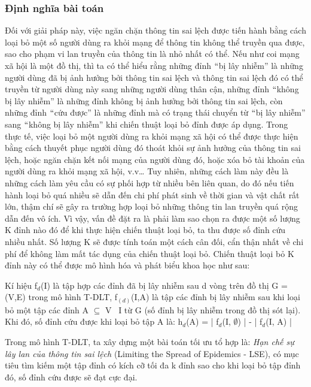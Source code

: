  		\subsubsection{Định nghĩa bài toán}
 		Đối với giải pháp này, việc ngăn chặn thông tin sai lệch được tiến hành bằng cách loại bỏ một số người dùng ra khỏi mạng để thông tin không thể truyền qua được, sao cho phạm vi lan truyền của thông tin là nhỏ nhất có thể. Nếu như coi mạng xã hội là một đồ thị, thì ta có thể hiểu rằng những đỉnh $``$bị lây nhiễm$”$ là những người dùng đã bị ảnh hưởng bởi thông tin sai lệch và thông tin sai lệch đó có thể truyền từ người dùng này sang những người dùng thân cận, những đỉnh $``$không bị lây nhiễm$”$ là những đỉnh không bị ảnh hưởng bởi thông tin sai lệch, còn những đỉnh $``$cứu được$”$ là những đỉnh mà có trạng thái chuyển từ $``$bị lây nhiễm$”$ sang $``$không bị lây nhiễm$”$ khi chiến thuật loại bỏ đỉnh được áp dụng. Trong thực tế, việc loại bỏ một người dùng ra khỏi mạng xã hội có thể được thực hiện bằng cách thuyết phục người dùng đó thoát khỏi sự ảnh hưởng của thông tin sai lệch, hoặc ngăn chặn kết nối mạng của người dùng đó, hoặc xóa bỏ tài khoản của người dùng ra khỏi mạng xã hội, v.v… Tuy nhiên, những cách làm này đều là những cách làm yêu cầu có sự phối hợp từ nhiều bên liên quan, do đó nếu tiến hành loại bỏ quá nhiều sẽ dẫn đến chi phí phát sinh về thời gian và vật chất rất lớn, thậm chí sẽ gây ra trường hợp loại bỏ những thông tin lan truyền quá rộng dẫn đến vô ích. Vì vậy, vấn đề đặt ra là phải làm sao chọn ra được một số lượng K đỉnh nào đó để khi thực hiện chiến thuật loại bỏ, ta thu được số đỉnh cứu nhiều nhất. Số lượng K sẽ được tính toán một cách cân đối, cẩn thận nhất về chi phí để không làm mất tác dụng của chiến thuật loại bỏ. Chiến thuật loại bỏ K đỉnh này có thể được mô hình hóa và phát biểu khoa học như sau:  
 		
 		Kí hiệu f$_{d}$(I) là tập hợp các đỉnh đã bị lây nhiễm sau d vòng trên đồ thị G = (V,E) trong mô hình T-DLT, f$_(d)$(I,A) là tập các đỉnh bị lây nhiễm sau khi loại bỏ một tập các đỉnh A $\subseteq$ V \ I từ G (số đỉnh bị lây nhiễm trong đồ thị sót lại). Khi đó, số đỉnh cứu được khi loại bỏ tập A là: h$_{d}$(A) = | f$_{d}$(I, $\emptyset$) | - | f$_{d}$(I, A) |
 		
 		Trong mô hình T-DLT, ta xây dựng một bài toán tối ưu tổ hợp là: {\itshape Hạn chế sự lây lan của thông tin sai lệch} (Limiting the Spread of Epidemics - LSE), có mục tiêu tìm kiếm một tập đỉnh có kích cỡ tối đa k đỉnh sao cho khi loại bỏ tập đỉnh đó, số đỉnh cứu được sẽ đạt cực đại.  
 		
